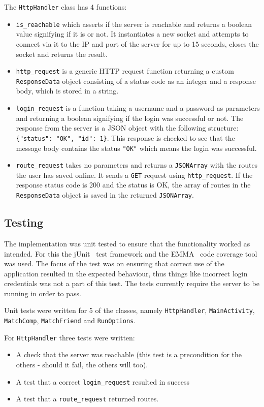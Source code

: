 The \texttt{HttpHandler} class has 4 functions: 
\begin{itemize}
	\item{\texttt{is\_reachable} which asserts if the server is reachable and returns a boolean value signifying if it is or not. It instantiates a new socket and attempts to connect via it to the \ac{IP} and port of the server for up to 15 seconds, closes the socket and returns the result.}
	\item{\texttt{http\_request} is a generic \ac{HTTP} request function returning a custom \texttt{ResponseData} object consisting of a status code as an integer and a response body, which is stored in a string.}
	\item{\texttt{login\_request} is a function taking a username and a password as parameters and returning a boolean signifying if the login was successful or not. The response from the server is a \ac{JSON} object with the following structure: \texttt{\{"status": "OK", "id": 1\}}. This response is checked to see that the message body contains the status \texttt{"OK"} which means the login was successful.}
	\item{\texttt{route\_request} takes no parameters and returns a \texttt{JSONArray} with the routes the user has saved online. It sends a \texttt{GET} request using \texttt{http\_request}. If the response status code is 200 and the status is OK, the array of routes in the \texttt{ResponseData} object is saved in the returned \texttt{JSONArray}.}
\end{itemize}

\subsection{Testing}
The implementation was unit tested to ensure that the functionality worked as intended. For this the jUnit~\citep{junit} test framework and the EMMA~\citep{emma} code coverage tool was used. The focus of the test was on ensuring that correct use of the application resulted in the expected behaviour, thus things like incorrect login credentials was not a part of this test. The tests currently require the server to be running in order to pass.

Unit tests were written for 5 of the classes, namely \texttt{Http\-Handler}, \texttt{Main\-Activity}, \texttt{Match\-Comp}, \texttt{Match\-Friend} and \texttt{Run\-Options}. 

For \texttt{HttpHandler} three tests were written:

\begin{itemize}
	\item{A check that the server was reachable (this test is a precondition for the others - should it fail, the others will too).}
	\item{A test that a correct \texttt{login\_request} resulted in success }
	\item{A test that a \texttt{route\_request} returned routes.}
\end{itemize}

